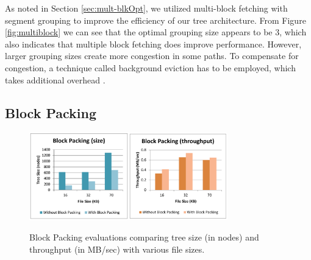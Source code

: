 \documentclass[conference]{IEEEtran}
\begin{document}
As noted in Section \ref{sec:mult-blkOpt}, we utilized multi-block fetching with segment grouping to improve the efficiency of our tree architecture. From Figure \ref{fig:multiblock} we can see that the optimal grouping size appears to be 3, which also indicates that multiple block fetching does improve performance. However, larger grouping sizes create more congestion in some paths. To compensate for congestion, a technique called background eviction has to be employed, which takes additional overhead \cite{oram-isca13, Yu14DSB}.

\subsection{Block Packing}

\label{sec:BlkPack}
\begin{figure}
\begin{center}
\noindent\includegraphics[width=4.3cm]{550.pdf}\includegraphics[width=4.3cm]{551.pdf}
\caption{Block Packing evaluations comparing tree size (in nodes) and throughput (in MB/sec) with various file sizes. }
\label{fig:blockpack}
\end{center}
\end{figure}
\end{document}
